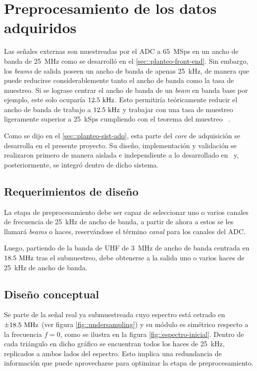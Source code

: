 \documentclass[../../main.tex]{subfiles}
\begin{document}
\graphicspath{{./figures}}
\chapter{Preprocesamiento de los datos adquiridos}\label{cap::preproc}
Las señales externas son muestreadas por el ADC a 65~MSps en un ancho de banda de 25~MHz como se desarrolló en el \cref{sec::planteo-front-end}. Sin embargo, los \textit{beams} de salida poseen un ancho de banda de apenas 25~kHz, de manera que puede reducirse considerablemente tanto el ancho de banda como la tasa de muestreo. Si se lograse centrar el ancho de banda de un  \textit{beam} en banda base por ejemplo, este solo ocuparía $12.5~\textrm{kHz}$. Esto permitiría teóricamente reducir el ancho de banda de trabajo a $12.5~\textrm{kHz}$ y trabajar con una tasa de muestreo ligeramente superior a 25~kSps cumpliendo con el teorema del muestreo~\cite{teorema-del-muestreo} .

Como se dijo en el \cref{sec::planteo-sist-adq}, esta parte del \textit{core} de adquisición se desarrolla en el presente proyecto. Su diseño, implementación y validación se realizaron primero de manera aislada e independiente a lo desarrollado en~\cite{proyecto-jose} y, posteriormente, se integró dentro de dicho sistema.

\section{Requerimientos de diseño}
La etapa de preprocesamiento debe ser capaz de seleccionar uno o varios canales de frecuencia de 25~kHz de ancho de banda, a partir de ahora a estos se les llamará \textit{beams} o haces, reservándose el término \textit{canal} para los canales del ADC.

Luego, partiendo de la banda de UHF de 3~MHz de ancho de banda centrada en $18.5~\textrm{MHz}$ tras el submuestreo, debe obtenerse a la salida uno o varios haces de 25~kHz de ancho de banda.

\section{Diseño conceptual}\label{sec::disenio-conceptual-preproc}
Se parte de la señal real ya submuestreada cuyo espectro está cetrado en $\pm 18.5~\textrm{MHz}$ (ver figura \ref{fig::undersampling}) y su módulo  es simétrico respecto a la frecuencia $f = 0$, como se ilustra en la figura \ref{fig::espectro-inicial}. Dentro de cada triángulo en dicho gráfico se encuentran todos los haces de 25~kHz, replicados a ambos lados del espectro. Esto implica una redundancia de información que puede aprovecharse para optimizar la etapa de preprocesamiento.
\end{document}
